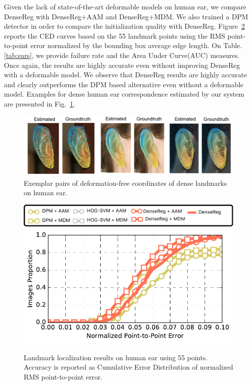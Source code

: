 Given the lack of state-of-the-art deformable models on human ear, we compare DenseReg with DenseReg+AAM and DenseReg+MDM.  We also trained a DPM detector in order to compare the initialization quality with DenseReg. Figure~\ref{fig:ears} reports the CED curves based on the 55 landmark points using the RMS point-to-point error normalized by the bounding box average edge length. On Table.\ref{tab:ears}, we provide failure rate and the Area Under Curve(AUC) measures. Once again, the results are highly accurate even without improving DenseReg with a deformable model. We observe that DenseReg results are highly accurate and clearly outperforms the DPM based alternative even without a deformable model. Examples for dense human ear correspondence estimated by our system  are presented in Fig.~\ref{fig:ears_examples}.


\begin{figure}
\centering
\includegraphics[width=\linewidth]{resources/Ear_Deformable_Model/dense/ears3.pdf}
\caption{Exemplar pairs of deformation-free coordinates of dense landmarks on human ear.}
\vspace{-0.5cm}
\label{fig:ears_examples}
\end{figure}


\begin{figure}
\centering
\includegraphics[width=\linewidth]{resources/Ear_Deformable_Model/dense/ear_legend.pdf}
\includegraphics[width=\linewidth]{resources/Ear_Deformable_Model/dense/ear_results.pdf}
\caption{Landmark localization results on human ear using 55 points. Accuracy is reported as Cumulative Error Distribution of normalized RMS point-to-point error.}
\vspace{-0.25cm}
\label{fig:ears}
\end{figure}


